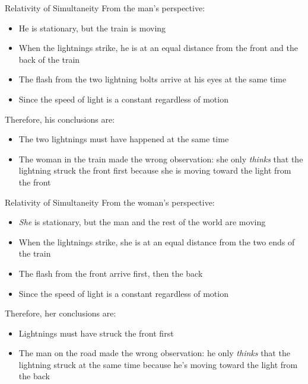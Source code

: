 \documentclass[12pt,compress,aspectratio=169]{beamer}
\begin{document}
\begin{frame}{Relativity of Simultaneity}
  From the man's perspective:
  \begin{itemize}
  \item He is stationary, but the train is moving
  \item When the lightnings strike, he is at an equal distance from the front
    and the back of the train
  \item The flash from the two lightning bolts arrive at his eyes at the same
    time
  \item Since the speed of light is a constant regardless of motion
  \end{itemize}
  Therefore, his conclusions are:
  \begin{itemize}
  \item The two lightnings must have happened at the same time
  \item The woman in the train made the wrong observation: she only
    \emph{thinks} that the lightning struck the front first because she is
    moving toward the light from the front
  \end{itemize}
\end{frame}


\begin{frame}{Relativity of Simultaneity}
  From the woman's perspective:
  \begin{itemize}
  \item\emph{She} is stationary, but the man and the rest of the world are
    moving
  \item When the lightnings strike, she is at an equal distance from the two
    ends of the train
  \item The flash from the front arrive first, then the back
  \item Since the speed of light is a constant regardless of motion
  \end{itemize}
  Therefore, her conclusions are:
  \begin{itemize}
  \item Lightnings must have struck the front first
  \item The man on the road made the wrong observation: he only \emph{thinks}
    that the lightning struck at the same time because he's moving toward the
    light from the back
  \end{itemize}
\end{frame}
\end{document}
